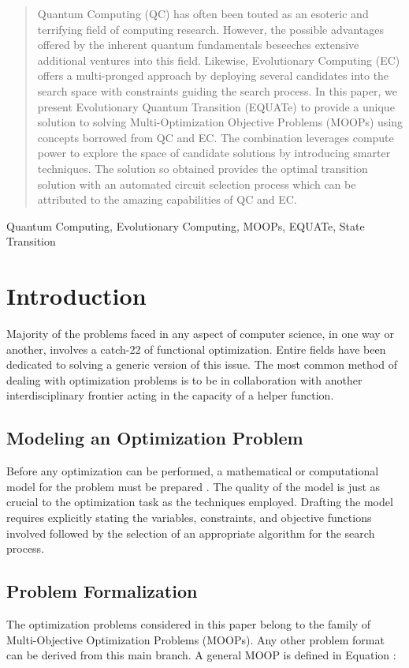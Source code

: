 \documentclass[conference]{IEEEtran}
\begin{document}
\begin{abstract}
Quantum Computing (QC) has often been touted as an esoteric and terrifying field of computing research. However, the possible advantages offered by the inherent quantum fundamentals beseeches extensive additional ventures into this field. Likewise, Evolutionary Computing (EC) offers a multi-pronged approach by deploying several candidates into the search space with constraints guiding the search process. In this paper, we present Evolutionary Quantum Transition (EQUATe) to provide a unique solution to solving Multi-Optimization Objective Problems (MOOPs) using concepts borrowed from QC and EC. The combination leverages compute power to explore the space of candidate solutions by introducing smarter techniques. The solution so obtained provides the optimal transition solution with an automated circuit selection process which can be attributed to the amazing capabilities of QC and EC. 
\end{abstract}

\begin{IEEEkeywords}
Quantum Computing, Evolutionary Computing, MOOPs, EQUATe, State Transition
\end{IEEEkeywords}

\section{Introduction}

Majority of the problems faced in any aspect of computer science, in one way or another, involves a catch-22 of functional optimization. Entire fields have been dedicated to solving a generic version of this issue. The most common method of dealing with optimization problems is to be in collaboration with another interdisciplinary frontier acting in the capacity of a helper function. 

\subsection{Modeling an Optimization Problem}
Before any optimization can be performed, a mathematical or computational model for the problem must be prepared \cite{hara}. The quality of the model is just as crucial to the optimization task as the techniques employed. Drafting the model requires explicitly stating the variables, constraints, and objective functions involved followed by the selection of an appropriate algorithm for the search process. 

\subsection{Problem Formalization}
The optimization problems considered in this paper belong to the family of Multi-Objective Optimization Problems (MOOPs)\cite{mul}. Any other problem format can be derived from this main branch. A general MOOP is defined in Equation :
\end{document}
